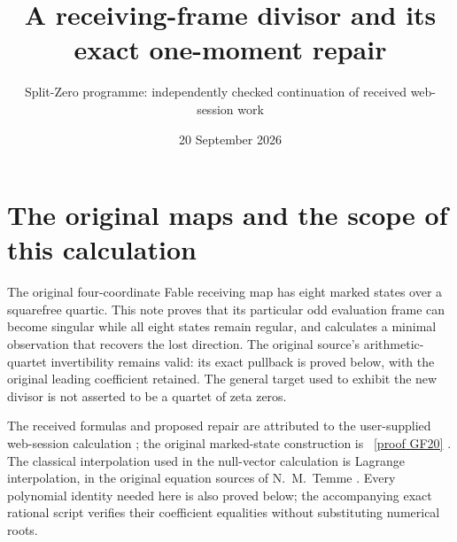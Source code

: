 \documentclass[11pt]{article}
\title{A receiving-frame divisor and its exact one-moment repair}
\author{Split-Zero programme: independently checked continuation of received web-session work}
\date{20 September 2026}
\begin{document}
\maketitle

\section{The original maps and the scope of this calculation}
The original four-coordinate Fable receiving map has eight marked states
over a squarefree quartic. This note proves that its particular odd
evaluation frame can become singular while all eight states remain
regular, and calculates a minimal observation that recovers the lost
direction. The original source's arithmetic-quartet invertibility
remains valid: its exact pullback is proved below, with the original
leading coefficient retained. The general target used to exhibit the
new divisor is not asserted to be a quartet of zeta zeros.

The received formulas and proposed repair are attributed to the
user-supplied web-session calculation \cite{Incoming}; the original
marked-state construction is \cite[SE1--14, GF20--21]{Fable}%
~\href{https://github.com/KokunoYumeto/zeta-function-research-reader/blob/5992ad50c0f2a06921f1fcaded7b4e38097c0739/workbenches/splitzero-tandem/continuations/20260920-original-kernel-mixed-determinants/providers/FABLE_TO_ORIGINAL_CONDUCTOR.tex\#L1598}{[proof GF20]}%
{}.
The classical interpolation used in the null-vector calculation is
Lagrange interpolation, in the original equation sources of
N.~M.~Temme \cite{Temme}. Every polynomial identity needed here is
also proved below; the accompanying exact rational script verifies
their coefficient equalities without substituting numerical roots.
\end{document}
